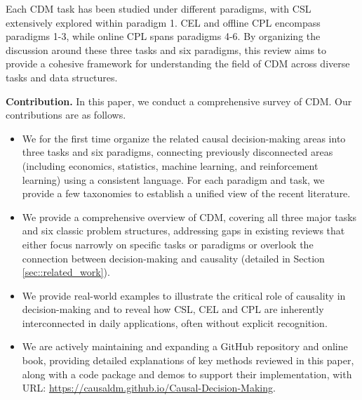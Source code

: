 Each \acrshort{CDM} task has been studied under different paradigms, with \acrshort{CSL} extensively explored within paradigm 1. \acrshort{CEL} and offline \acrshort{CPL} encompass paradigms 1-3, while online \acrshort{CPL} spans paradigms 4-6. By organizing the discussion around these three tasks and six paradigms, this review aims to provide a cohesive framework for understanding the field of \acrlong{CDM} across diverse tasks and data structures.




\textbf{Contribution.} In this paper, we conduct a comprehensive survey of \acrshort{CDM}. 
Our contributions are as follows. 
\begin{itemize}
    \item We for the first time organize the related causal decision-making areas into three tasks and six paradigms, connecting previously disconnected areas (including economics, statistics, machine learning, and reinforcement learning) using a consistent language. For each paradigm and task, we provide a few taxonomies to establish a unified view of the recent literature.
    \item We provide a comprehensive overview of \acrshort{CDM}, covering all three major tasks and six classic problem structures, addressing gaps in existing reviews that either focus narrowly on specific tasks or paradigms or overlook the connection between decision-making and causality (detailed in Section \ref{sec::related_work}).
    \item We provide real-world examples to illustrate the critical role of causality in decision-making and to reveal how \acrshort{CSL}, \acrshort{CEL} and \acrshort{CPL} are inherently interconnected in daily applications, often without explicit recognition.
    \item We are actively maintaining and expanding a GitHub repository and online book, providing detailed explanations of key methods reviewed in this paper, along with a code package and demos to support their implementation, with URL: \url{https://causaldm.github.io/Causal-Decision-Making}.
\end{itemize}


